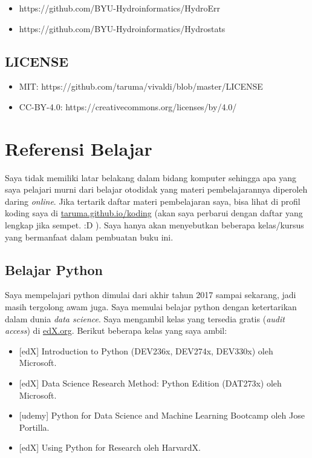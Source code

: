 \documentclass[11pt]{article}
\providecommand{\tightlist}{%
      \setlength{\itemsep}{0pt}\setlength{\parskip}{0pt}}
\begin{document}
\begin{itemize}
\tightlist
\item
  https://github.com/BYU-Hydroinformatics/HydroErr
\item
  https://github.com/BYU-Hydroinformatics/Hydrostats
\end{itemize}

\hypertarget{license}{%
\subsection{LICENSE}\label{license}}

\begin{itemize}
\tightlist
\item
  MIT: https://github.com/taruma/vivaldi/blob/master/LICENSE
\item
  CC-BY-4.0: https://creativecommons.org/licenses/by/4.0/
\end{itemize}

    \hypertarget{referensi-belajar}{%
\section{Referensi Belajar}\label{referensi-belajar}}

Saya tidak memiliki latar belakang dalam bidang komputer sehingga apa
yang saya pelajari murni dari belajar otodidak yang materi
pembelajarannya diperoleh daring \emph{online}. Jika tertarik daftar
materi pembelajaran saya, bisa lihat di profil koding saya di
\href{https://taruma.github.io/koding}{taruma.github.io/koding} (akan
saya perbarui dengan daftar yang lengkap jika sempet. :D ). Saya hanya
akan menyebutkan beberapa kelas/kursus yang bermanfaat dalam pembuatan
buku ini.

    \hypertarget{belajar-python}{%
\subsection{Belajar Python}\label{belajar-python}}

Saya mempelajari python dimulai dari akhir tahun 2017 sampai sekarang,
jadi masih tergolong awam juga. Saya memulai belajar python dengan
ketertarikan dalam dunia \emph{data science}. Saya mengambil kelas yang
tersedia gratis (\emph{audit access}) di
\href{https://www.edx.org/}{edX.org}. Berikut beberapa kelas yang saya
ambil:

\begin{itemize}
\tightlist
\item
  {[}edX{]} Introduction to Python (DEV236x, DEV274x, DEV330x) oleh
  Microsoft.
\item
  {[}edX{]} Data Science Research Method: Python Edition (DAT273x) oleh
  Microsoft.
\item
  {[}udemy{]} Python for Data Science and Machine Learning Bootcamp oleh
  Jose Portilla.
\item
  {[}edX{]} Using Python for Research oleh HarvardX.
\end{itemize}
\end{document}
